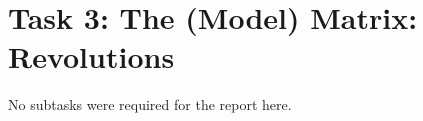 \section{Task 3: The (Model) Matrix: Revolutions}\label{sec:task3}
No subtasks were required for the report here.
